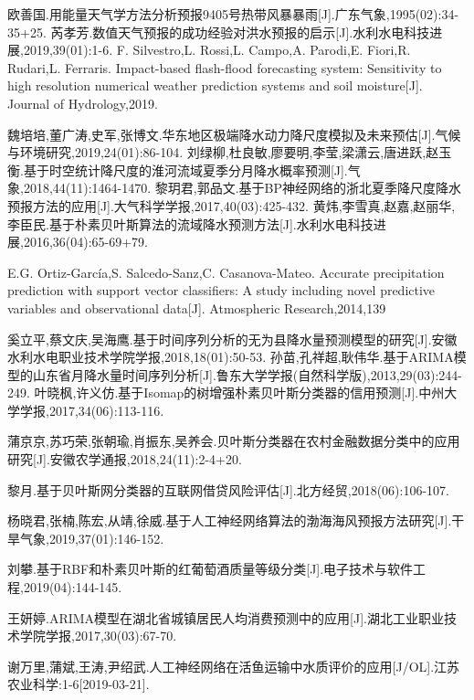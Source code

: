 \documentclass{ctexart}
\begin{document}
\newpage
\begin{thebibliography}{1}
欧善国.用能量天气学方法分析预报9405号热带风暴暴雨[J].广东气象,1995(02):34-35+25.
芮孝芳.数值天气预报的成功经验对洪水预报的启示[J].水利水电科技进展,2019,39(01):1-6.
F. Silvestro,L. Rossi,L. Campo,A. Parodi,E. Fiori,R. Rudari,L. Ferraris. Impact-based flash-flood forecasting system: Sensitivity to high resolution numerical weather prediction systems and soil moisture[J]. Journal of Hydrology,2019.

魏培培,董广涛,史军,张博文.华东地区极端降水动力降尺度模拟及未来预估[J].气候与环境研究,2019,24(01):86-104.
刘绿柳,杜良敏,廖要明,李莹,梁潇云,唐进跃,赵玉衡.基于时空统计降尺度的淮河流域夏季分月降水概率预测[J].气象,2018,44(11):1464-1470.
黎玥君,郭品文.基于BP神经网络的浙北夏季降尺度降水预报方法的应用[J].大气科学学报,2017,40(03):425-432.
黄炜,李雪真,赵嘉,赵丽华,李臣民.基于朴素贝叶斯算法的流域降水预测方法[J].水利水电科技进展,2016,36(04):65-69+79.

E.G. Ortiz-García,S. Salcedo-Sanz,C. Casanova-Mateo. Accurate precipitation prediction with support vector classifiers: A study including novel predictive variables and observational data[J]. Atmospheric Research,2014,139

奚立平,蔡文庆,吴海鹰.基于时间序列分析的无为县降水量预测模型的研究[J].安徽水利水电职业技术学院学报,2018,18(01):50-53.
孙苗,孔祥超,耿伟华.基于ARIMA模型的山东省月降水量时间序列分析[J].鲁东大学学报(自然科学版),2013,29(03):244-249.
叶晓枫,许义仿.基于Isomap的树增强朴素贝叶斯分类器的信用预测[J].中州大学学报,2017,34(06):113-116.


蒲京京,苏巧荣,张朝瑜,肖振东,吴养会.贝叶斯分类器在农村金融数据分类中的应用研究[J].安徽农学通报,2018,24(11):2-4+20.

黎月.基于贝叶斯网分类器的互联网借贷风险评估[J].北方经贸,2018(06):106-107.

杨晓君,张楠,陈宏,从靖,徐威.基于人工神经网络算法的渤海海风预报方法研究[J].干旱气象,2019,37(01):146-152.

刘攀.基于RBF和朴素贝叶斯的红葡萄酒质量等级分类[J].电子技术与软件工程,2019(04):144-145.

王妍婷.ARIMA模型在湖北省城镇居民人均消费预测中的应用[J].湖北工业职业技术学院学报,2017,30(03):67-70.

谢万里,蒲斌,王涛,尹绍武.人工神经网络在活鱼运输中水质评价的应用[J/OL].江苏农业科学:1-6[2019-03-21].


\end{thebibliography}
\end{document}
